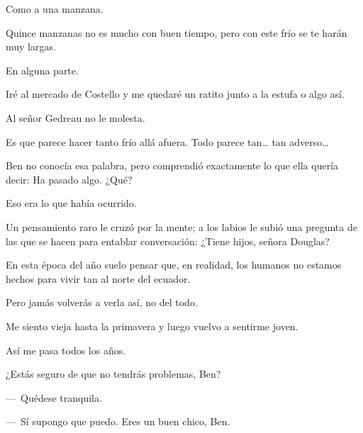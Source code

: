 \sk
Como a una manzana. 

\sk
Quince manzanas no es mucho con buen
tiempo, pero con este frío se te harán muy largas.

\sk
En alguna parte. 

\sk
Iré al mercado de Costello y me
quedaré un ratito junto a la estufa o algo así.

\sk
Al señor Gedreau no le molesta.

\sk
Es que parece hacer tanto frío allá afuera.
Todo parece tan\ldots{} tan adverso\ldots{}

\sk
Ben no conocía esa palabra, pero comprendió
exactamente lo que ella quería decir: Ha pasado
algo. ¿Qué?

\sk
Eso era lo que había ocurrido.

\sk
Un pensamiento raro le cruzó por la mente;
a los labios le subió una pregunta de las que se
hacen para entablar conversación: ¿Tiene hijos,
señora Douglas?

\sk
En esta época del año suelo pensar que, en
realidad, los humanos no estamos hechos para
vivir tan al norte del ecuador.

\sk
Pero jamás volverás a verla así, no del todo.

\sk
Me siento vieja hasta la primavera y luego vuelvo a sentirme joven.

\sk
Así me pasa todos los años.

\sk
¿Estás seguro de que no tendrás problemas, Ben?

\sk
---~Quédese tranquila.

---~Sí supongo que puedo. Eres un buen chico, Ben.

